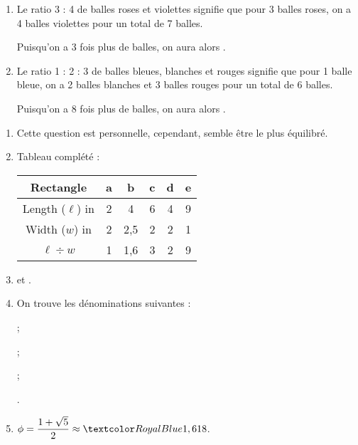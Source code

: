 \begin{enumerate}
\begin{enumerate}
         \end{enumerate}
      \item Le ratio 3 : 4 de balles roses et violettes signifie que pour 3 balles roses, on a 4 balles violettes pour un total de 7 balles. \par
         Puisqu'on a 3 fois plus de balles, on aura alors .
      \item Le ratio 1 : 2 : 3 de balles bleues, blanches et rouges signifie que pour 1 balle bleue, on a 2 balles blanches et 3 balles rouges pour un total de 6 balles. \par
         Puisqu'on a 8 fois plus de balles, on aura alors .
   \end{enumerate}

\vfill



   \begin{enumerate}
      \item Cette question est personnelle, cependant,  semble être le plus équilibré.
      \item Tableau complété :
         \begin{center}
            {\small
               \begin{tabular}{|c|*5{C{2}|}}
                  \hline
                  Rectangle & a & b & c & d & e \\
                  \hline
                  Length ($\ell$) in \Lg{} & 2 & 4 & 6 & 4 & 9 \\
                  \hline
                  Width ($w$) in \Lg{} & 2 & 2,5 & 2 & 2 & 1 \\
                  \hline
                  $\ell\div w$ & 1 & 1,6 & 3 & 2 & 9 \\
                  \hline
               \end{tabular}}
         \end{center}
      \item {} et .
      \item On trouve les dénominations suivantes : \par
         \begin{multicols}{2}
             ; \par
             ; \par
             ; \par
            .
         \end{multicols}
      \item $\phi =\dfrac{1+\sqrt5}{2} \approx \cor{1,618}$.
   \end{enumerate}

